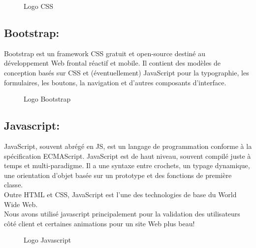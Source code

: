 \documentclass[12pt]{report}
\begin{document}
\vspace{0.22in}

\begin{figure}[h]
\centering
\caption{Logo CSS}
\end{figure}

\subsection{Bootstrap:}

Bootstrap est un framework CSS gratuit et open-source destiné au développement Web frontal réactif et mobile. Il contient des modèles de conception basés sur CSS et (éventuellement) JavaScript pour la typographie, les formulaires, les boutons, la navigation et d'autres composants d'interface.

\begin{figure}[h]
\centering
\vspace{-0.2in}
\caption{Logo Bootstrap}
\end{figure}

\newpage

\subsection{Javascript:}

JavaScript, souvent abrégé en JS, est un langage de programmation conforme à la spécification ECMAScript. JavaScript est de haut niveau, souvent compilé juste à temps et multi-paradigme. Il a une syntaxe entre crochets, un typage dynamique, une orientation d'objet basée sur un prototype et des fonctions de première classe.
\\
Outre HTML et CSS, JavaScript est l'une des technologies de base du World Wide Web.
\\
Nous avons utilisé javascript principalement pour la validation des utilisateurs côté client et certaines animations pour un site Web plus beau!


\begin{figure}[h]
\centering
\caption{Logo Javascript}
\end{figure}
\end{document}
